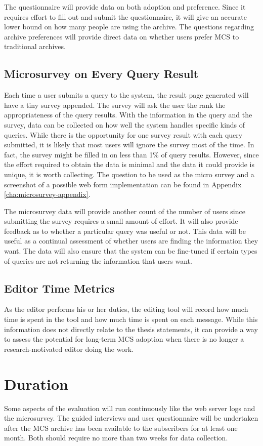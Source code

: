 The questionnaire will provide data on both adoption and preference. Since it
requires effort to fill out and submit the questionnaire, it will give an
accurate lower bound on how many people are using the archive. The questions
regarding archive preferences will provide direct data on whether users prefer
MCS to traditional archives.

\subsection{Microsurvey on Every Query Result}
Each time a user submits a query to the system, the result page generated will
have a tiny survey appended. The survey will ask the user the rank the
appropriateness of the query results. With the information in the query and the
survey, data can be collected on how well the system handles specific kinds of
queries. While there is the opportunity for one survey result with each query
submitted, it is likely that most users will ignore the survey most of the
time. In fact, the survey might be filled in on less than 1\% of query results.
However, since the effort required to obtain the data is minimal and the data
it could provide is unique, it is worth collecting. The question to be used as
the micro survey and a screenshot of a possible web form implementation can be
found in Appendix \ref{cha:microsurvey-appendix}.

The microsurvey data will provide another count of the number of users since
submitting the survey requires a small amount of effort. It will also provide
feedback as to whether a particular query was useful or not. This data will be
useful as a continual assessment of whether users are finding the information
they want. The data will also ensure that the system can be fine-tuned if
certain types of queries are not returning the information that users want.

\subsection{Editor Time Metrics}
As the editor performs his or her duties, the editing tool will record how much
time is spent in the tool and how much time is spent on each message. While
this information does not directly relate to the thesis statements, it can
provide a way to assess the potential for long-term MCS adoption when there is
no longer a research-motivated editor doing the work.

\section{Duration}
Some aspects of the evaluation will run continuously like the web server logs
and the microsurvey. The guided interviews and user questionnaire will be
undertaken after the MCS archive has been available to the subscribers for at
least one month. Both should require no more than two weeks for data
collection.

